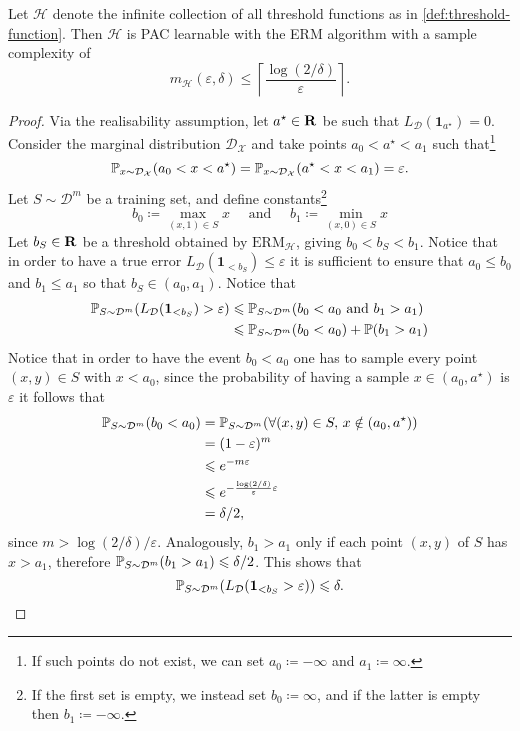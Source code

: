 \begin{lemma}
\label{lem:threshold-functions-pac-learnable}
Let \(\mathcal{H}\) denote the infinite collection of all threshold functions as in
\cref{def:threshold-function}. Then \(\mathcal{H}\) is PAC learnable with the ERM
algorithm with a sample complexity of
\[
m_{\mathcal{H}}(\varepsilon, \delta) \leq \left\lceil \frac{\log(2/\delta)}{\varepsilon} \right\rceil.
\]
\end{lemma}

\begin{proof}
Via the realisability assumption, let \(a^{\star} \in \mathbf{R}\) be such that
\(L_{\mathcal{D}}(\mathbf{1}_{a^{\star}}) = 0\). Consider the marginal distribution
\(\mathcal{D}_{\mathcal{X}}\) and take points \(a_0 < a^{\star} < a_1\) such that\footnote{If such
  points do not exist, we can set \(a_0 \coloneq -\infty\) and \(a_1 \coloneq \infty\).}
\[
\operatorname{\mathbb{P}}_{x \sim \mathcal{D}_{\mathcal{X}}}(a_0 < x < a^{\star})
= \operatorname{\mathbb{P}}_{x \sim \mathcal{D}_{\mathcal{X}}}(a^{\star} < x < a_1)
= \varepsilon.
\]
Let \(S \sim \mathcal{D}^m\) be a training set, and define constants\footnote{If the first
  set is empty, we instead set \(b_0 \coloneq \infty\), and if the latter is empty then
  \(b_1 \coloneq -\infty\).}
\[
b_0 \coloneq \max_{(x, 1) \in S} x
\quad \text{ and } \quad
b_1 \coloneq \min_{(x, 0) \in S} x
\]
Let \(b_S \in \mathbf{R}\) be a threshold obtained by \(\text{ERM}_{\mathcal{H}}\), giving
\(b_0 < b_S < b_1\). Notice that in order to have a true error
\(L_{\mathcal{D}}(\mathbf{1}_{< b_S}) \leq \varepsilon\) it is sufficient to ensure that \(a_0 \leq b_0\)
and \(b_1 \leq a_1\) so that \(b_S \in (a_0, a_1)\). Notice that
\begin{align*}
  \operatorname{\mathbb{P}}_{S \sim \mathcal{D}^m}(L_{\mathcal{D}}(\mathbf{1}_{< b_S}) > \varepsilon)
  &\leqslant \operatorname{\mathbb{P}}_{S \sim \mathcal{D}^m}(b_0 < a_0 \text{ and } b_1 > a_1) \\
  &\leqslant \operatorname{\mathbb{P}}_{S \sim \mathcal{D}^m}(b_0 < a_0) + \operatorname{\mathbb{P}}(b_1 > a_1)
\end{align*}
Notice that in order to have the event \(b_0 < a_0\) one has to sample every point
\((x, y) \in S\) with \(x < a_0\), since the probability of having a sample \(x \in
(a_0, a^{\star})\) is \(\varepsilon\) it follows that
\begin{align*}
  \operatorname{\mathbb{P}}_{S \sim \mathcal{D}^m}(b_0 < a_0)
  &= \operatorname{\mathbb{P}}_{S \sim \mathcal{D}^m}(\forall (x, y) \in S,\, x \notin (a_0, a^{\star})) \\
  &= (1 - \varepsilon)^m \\
  &\leqslant e^{-m \varepsilon} \\
  &\leqslant e^{- \frac{\log(2/\delta)}{\varepsilon} \varepsilon} \\
  &= \delta/2,
\end{align*}
since \(m > \log(2/\delta)/\varepsilon\). Analogously, \(b_1 > a_1\) only if each point
\((x, y)\) of \(S\) has \(x > a_1\), therefore
\(\operatorname{\mathbb{P}}_{S \sim \mathcal{D}^m}(b_1 > a_1) \leqslant \delta/2\).  This shows that
\[
\operatorname{\mathbb{P}}_{S \sim \mathcal{D}^m}(L_{\mathcal{D}}(\mathbf{1}_{< b_S} > \varepsilon)) \leqslant \delta.
\]
\end{proof}

